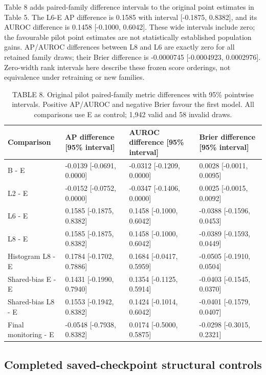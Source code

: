 Table 8 adds paired-family difference intervals to the original point estimates in Table 5. The L6-E AP difference is 0.1585 with interval [-0.1875, 0.8382], and its AUROC difference is 0.1458 [-0.1000, 0.6042]. These wide intervals include zero; the favourable pilot point estimates are not statistically established population gains. AP/AUROC differences between L8 and L6 are exactly zero for all retained family draws; their Brier difference is -0.0000745 [-0.0004923, 0.0002976]. Zero-width rank intervals here describe these frozen score orderings, not equivalence under retraining or new families.

\begin{table}[t]
\caption{TABLE 8. Original pilot paired-family metric differences with 95\% pointwise intervals. Positive AP/AUROC and negative Brier favour the first model. All comparisons use E as control; 1,942 valid and 58 invalid draws.}
\centering\small
\begin{tabular}{llll}
\toprule Comparison & AP difference [95\% interval] & AUROC difference [95\% interval] & Brier difference [95\% interval]\\\midrule
B - E & -0.0139 [-0.0691, 0.0000] & -0.0312 [-0.1209, 0.0000] & 0.0028 [-0.0011, 0.0095]\\
L2 - E & -0.0152 [-0.0752, 0.0000] & -0.0347 [-0.1406, 0.0000] & 0.0025 [-0.0015, 0.0092]\\
L6 - E & 0.1585 [-0.1875, 0.8382] & 0.1458 [-0.1000, 0.6042] & -0.0388 [-0.1596, 0.0453]\\
L8 - E & 0.1585 [-0.1875, 0.8382] & 0.1458 [-0.1000, 0.6042] & -0.0389 [-0.1593, 0.0449]\\
Histogram L8 - E & 0.1784 [-0.1702, 0.7886] & 0.1684 [-0.0417, 0.5959] & -0.0505 [-0.1910, 0.0504]\\
Shared-bias E - E & 0.1431 [-0.1990, 0.7940] & 0.1354 [-0.1125, 0.5914] & -0.0403 [-0.1545, 0.0370]\\
Shared-bias L8 - E & 0.1553 [-0.1942, 0.8382] & 0.1424 [-0.1014, 0.6042] & -0.0401 [-0.1579, 0.0407]\\
Final monitoring - E & -0.0548 [-0.7938, 0.8382] & 0.0174 [-0.5000, 0.5875] & -0.0298 [-0.3015, 0.2321]\\\bottomrule
\end{tabular}
\end{table}


\subsection{Completed saved-checkpoint structural controls}

